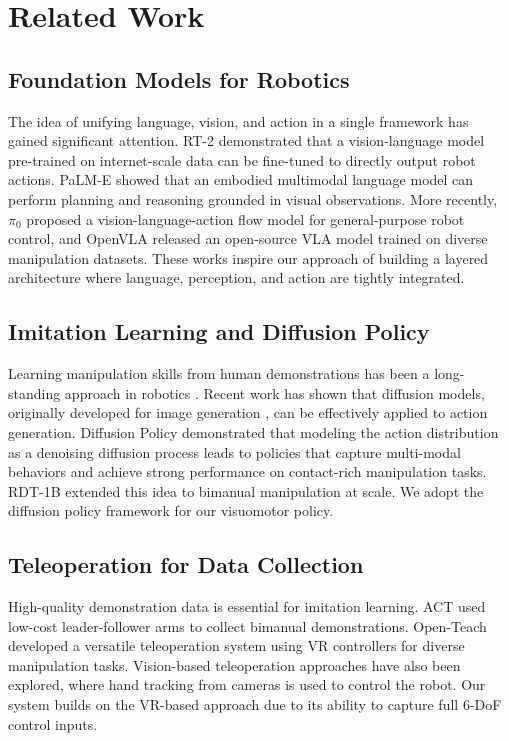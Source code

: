 \documentclass[conference]{IEEEtran}
\begin{document}
\section{Related Work}

\subsection{Foundation Models for Robotics}

The idea of unifying language, vision, and action in a single framework has gained significant attention. RT-2 \cite{brohan2023rt2} demonstrated that a vision-language model pre-trained on internet-scale data can be fine-tuned to directly output robot actions. PaLM-E \cite{driess2023palme} showed that an embodied multimodal language model can perform planning and reasoning grounded in visual observations. More recently, $\pi_0$ \cite{black2024pi0} proposed a vision-language-action flow model for general-purpose robot control, and OpenVLA \cite{kim2024openvla} released an open-source VLA model trained on diverse manipulation datasets. These works inspire our approach of building a layered architecture where language, perception, and action are tightly integrated.

\subsection{Imitation Learning and Diffusion Policy}

Learning manipulation skills from human demonstrations has been a long-standing approach in robotics \cite{mandlekar2021matters}. Recent work has shown that diffusion models, originally developed for image generation \cite{ho2020ddpm}, can be effectively applied to action generation. Diffusion Policy \cite{chi2023diffusion} demonstrated that modeling the action distribution as a denoising diffusion process leads to policies that capture multi-modal behaviors and achieve strong performance on contact-rich manipulation tasks. RDT-1B \cite{liu2024rdt} extended this idea to bimanual manipulation at scale. We adopt the diffusion policy framework for our visuomotor policy.

\subsection{Teleoperation for Data Collection}

High-quality demonstration data is essential for imitation learning. ACT \cite{zhao2023act} used low-cost leader-follower arms to collect bimanual demonstrations. Open-Teach \cite{iyer2024openteach} developed a versatile teleoperation system using VR controllers for diverse manipulation tasks. Vision-based teleoperation approaches \cite{handa2020dexpilot} have also been explored, where hand tracking from cameras is used to control the robot. Our system builds on the VR-based approach due to its ability to capture full 6-DoF control inputs.
\end{document}

